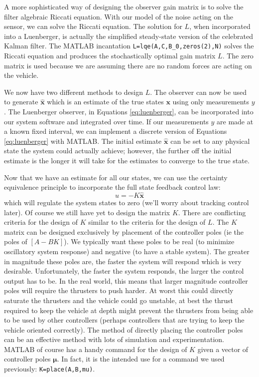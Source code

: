 \documentclass{article}
\begin{document}
A more sophisticated way of designing the observer gain matrix is to solve the filter algebraic Riccati equation.  With our model of the noise acting on the sensor, we can solve the Riccati equation.  The solution for $L$, when incorporated into a Luenberger, is actually the simplified steady-state version of the celebrated Kalman filter.  The MATLAB incantation \verb+L=lqe(A,C,B_0,zeros(2),N)+ solves the Riccati equation and produces the stochastically optimal gain matrix $L$.  The zero matrix is used because we are assuming there are no random forces are acting on the vehicle.

%
%
%
%
%
%
%


We now have two different methods to design $L$.  The observer can now be used to generate $\pmb{\hat{x}}$ which is an estimate of the true states $\pmb{x}$ using only measurements $y$.  The Luenberger observer, in Equations \ref{eq:luenberger}, can be incorporated into our system software and integrated over time.  If our measurements $y$ are made at a known fixed interval, we can implement a discrete version of Equations \ref{eq:luenberger} with MATLAB.  The initial estimate $\pmb{\hat{x}}$ can be set to any physical state the system could actually achieve; however, the further off the initial estimate is the longer it will take for the estimates to converge to the true state.   


Now that we have an estimate for all our states, we can use the certainty equivalence principle to incorporate the full state feedback control law: 
\begin{equation}
\label{eq:equivalencePrinciple}
u=-K\pmb{\hat{x}} 
\end{equation}
which will regulate the system states to zero (we'll worry about tracking control later).  Of course we still have yet to design the matrix $K$.  There are conflicting criteria for the design of $K$ similar to the criteria for the design of $L$.  The $K$ matrix can be designed exclusively by placement of the controller poles (ie the poles of $[A-BK]$).  We typically want these poles to be real (to minimize oscillatory system response) and negative (to have a stable system).  The greater in magnitude these poles are, the faster the system will respond which is very desirable.  Unfortunately, the faster the system responds, the larger the control output has to be.  In the real world, this means that larger magnitude controller poles will require the thrusters to push harder.  At worst this could directly saturate the thrusters and the vehicle could go unstable, at best the thrust required to keep the vehicle at depth might prevent the thrusters from being able to be used by other controllers (perhaps controllers that are trying to keep the vehicle oriented correctly).  The method of directly placing the controller poles can be an effective method with lots of simulation and experimentation.  MATLAB of course has a handy command for the design of $K$ given a vector of controller poles $\pmb{\mu}$.  In fact, it is the intended use for a command we used previously: \verb+K=place(A,B,mu)+.
\end{document}
